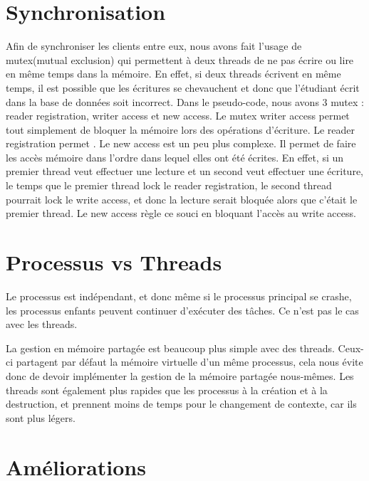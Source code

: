 \documentclass[utf8]{article}
\begin{document}
\section{Synchronisation}
\par
\indent

Afin de synchroniser les clients entre eux, nous avons fait l'usage de mutex(mutual exclusion) qui permettent 
à deux threads de ne pas écrire ou lire en même temps dans la mémoire.
En effet, si deux threads écrivent en même temps, il est possible que les écritures se chevauchent et donc que l'étudiant écrit dans la base de données soit incorrect.
\newline
Dans le pseudo-code, nous avons 3 mutex : reader registration, writer access et new access.
Le mutex writer access permet tout simplement de bloquer la mémoire lors des opérations d'écriture. Le reader registration permet .
Le new access est un peu plus complexe. Il permet de faire les accès mémoire dans l'ordre dans lequel elles ont été écrites.
En effet, si un premier thread veut effectuer une lecture et un second veut effectuer une écriture, le temps que le premier thread lock le reader registration, le second 
thread pourrait lock le write access, et donc la lecture serait bloquée alors que c'était le premier thread.
Le new access règle ce souci en bloquant l'accès au write access.
\par
\section{Processus vs Threads}
\par
\indent

Le processus est indépendant, et donc même si le processus principal se crashe, les processus enfants peuvent continuer d'exécuter des tâches. Ce n'est pas le cas avec les threads.

La gestion en mémoire partagée est beaucoup plus simple avec des threads. Ceux-ci partagent par défaut la mémoire virtuelle d'un même processus, cela nous évite donc de devoir implémenter la gestion de la mémoire partagée nous-mêmes.
Les threads sont également plus rapides que les processus à la création et à la destruction, et prennent moins de temps pour le changement de contexte, car ils sont plus légers.\newline



\par
\section{Améliorations}
\par
\indent
\end{document}
